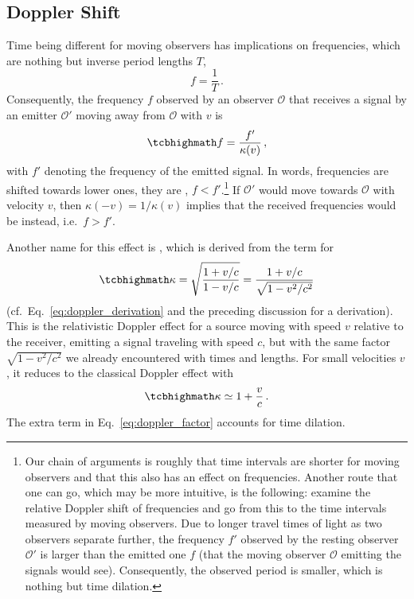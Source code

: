\documentclass[../relativity_main.tex]{subfiles}
\begin{document}
		\subsection{Doppler Shift}
		\label{subsec:doppler}
Time being different for moving observers has implications on frequencies, which are nothing but inverse period lengths $T$,
\begin{equation}
	f = \frac{1}{T} \, .
\end{equation}
Consequently, the frequency $f$ observed by an observer $\mathcal{O}$ that receives a signal by an emitter $\mathcal{O}'$ moving away from $\mathcal{O}$ with $v$ is
\begin{equation}
	\eqbox{f = \frac{f'}{\kappa(v)}} \, ,
\end{equation}
with $f'$ denoting the frequency of the emitted signal. In words, frequencies are shifted towards lower ones, they are , $f < f'$.\footnote{Our chain of arguments is roughly that time intervals are shorter for moving observers and that this also has an effect on frequencies. Another route that one can go, which may be more intuitive, is the following: examine the relative Doppler shift of frequencies and go from this to the time intervals measured by moving observers. Due to longer travel times of light as two observers separate further, the frequency $f'$ observed by the resting observer $\mathcal{O}'$ is larger than the emitted one $f$ (that the moving observer $\mathcal{O}$ emitting the signals would see). Consequently, the observed period is smaller, which is nothing but time dilation.
}
If $\mathcal{O}'$ would move towards $\mathcal{O}$ with velocity $v$, then $\kappa(-v) = 1 / \kappa(v)$ implies that the received frequencies would be  instead, i.e.~$f > f'$.


Another name for this effect is , which is derived from the term  for
\begin{equation}\label{eq:doppler_factor}
	\eqbox{\kappa = \sqrt{\frac{1 + v / c}{1 - v / c}} = \frac{1 + v / c}{\sqrt{1 - v^2 / c^2}}}
\end{equation}
(cf.~Eq.~\eqref{eq:doppler_derivation} and the preceding discussion for a derivation). This is the relativistic Doppler effect for a source moving with speed $v$ relative to the receiver, emitting a signal traveling with speed $c$, but with the same factor $\sqrt{1 - v^2 / c^2}$ we already encountered with times and lengths. For small velocities $v$, it reduces to the classical Doppler effect with
\begin{equation}\label{eq:doppler_class}
	\eqbox{\kappa \simeq 1 + \frac{v}{c}} \, .
\end{equation}
The extra term in Eq.~\eqref{eq:doppler_factor} accounts for time dilation.
\end{document}
